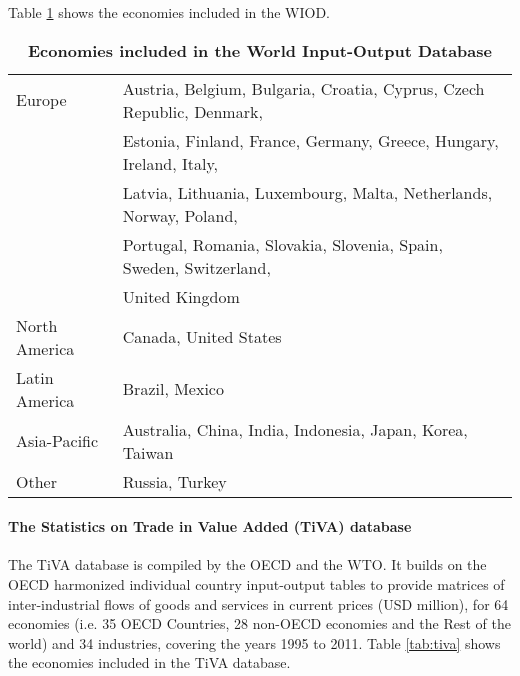 \documentclass[11pt,a4paper]{article}
\begin{document}
Table \ref{tab:wiod} shows the economies included in the WIOD.
 
 
\begin{table}[!h]
\begin{threeparttable}
\centering
\centering
\caption{\small{\textbf{Economies included in the World Input-Output Database}}}
\small
\begin{tabular}{ll}
\hline\hline
Europe & Austria, Belgium, Bulgaria, Croatia, Cyprus, Czech Republic, Denmark,\\
& Estonia, Finland, France, Germany, Greece, Hungary, Ireland, Italy,\\
& Latvia, Lithuania, Luxembourg, Malta, Netherlands, Norway, Poland,\\
&Portugal, Romania, Slovakia, Slovenia, Spain, Sweden, Switzerland,\\
& United Kingdom\\
North  America& Canada, United States\\
Latin America & Brazil, Mexico \\
Asia-Pacific & Australia, China, India, Indonesia, Japan, Korea, Taiwan\\
Other & Russia, Turkey\\
\hline\hline
\end{tabular} 
\label{tab:wiod}
\end{threeparttable}
\end{table} 

\paragraph{The Statistics on Trade in Value Added (TiVA) database}
The TiVA database is compiled by the OECD and the WTO. It builds on the OECD harmonized individual country input-output tables to provide matrices of inter-industrial flows of goods and services in current prices (USD million), for 64 economies (i.e. 35 OECD Countries, 28 non-OECD economies and the Rest of the world) and 34 industries, covering the years 1995 to 2011. 
Table \ref{tab:tiva} shows the economies included in the TiVA database.
\end{document}
